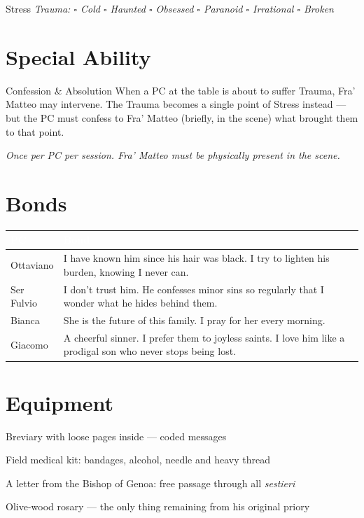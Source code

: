 \medskip
\begin{pgclockbox}{Stress \hfill {}}
  \small\textit{Trauma: $\square$ Cold \quad $\square$ Haunted \quad $\square$ Obsessed \quad $\square$ Paranoid \quad $\square$ Irrational \quad $\square$ Broken}
\end{pgclockbox}

\section*{Special Ability}
\begin{doriabox}{Confession \& Absolution}
  When a PC at the table is about to suffer Trauma, Fra' Matteo may intervene.
  The Trauma becomes a single point of Stress instead --- but the PC must confess
  to Fra' Matteo (briefly, in the scene) what brought them to that point.

  \medskip\noindent\textit{Once per PC per session. Fra' Matteo must be physically present in the scene.}
\end{doriabox}

\section*{Bonds}
\begin{table}[h]
\centering\renewcommand{\arraystretch}{1.4}
\begin{tabularx}{\linewidth}{@{}L{2.4cm} X@{}}
  \toprule{}
  \textcolor{white}{\textbf{PC}} & \textcolor{white}{\textbf{Bond}} \\
  \midrule
  Ottaviano & I have known him since his hair was black. I try to lighten his burden, knowing I never can. \\
  Ser Fulvio & I don't trust him. He confesses minor sins so regularly that I wonder what he hides behind them. \\
  Bianca & She is the future of this family. I pray for her every morning. \\
  Giacomo & A cheerful sinner. I prefer them to joyless saints. I love him like a prodigal son who never stops being lost. \\
  \bottomrule
\end{tabularx}
\end{table}

\section*{Equipment}
\begin{goldlist}
  \item Breviary with loose pages inside --- coded messages
  \item Field medical kit: bandages, alcohol, needle and heavy thread
  \item A letter from the Bishop of Genoa: free passage through all \textit{sestieri}
  \item Olive-wood rosary --- the only thing remaining from his original priory
\end{goldlist}

